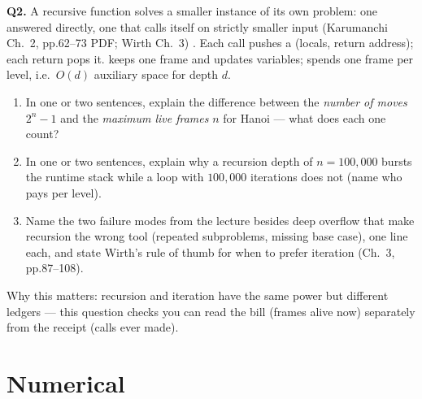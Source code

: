 \documentclass[11pt]{article}
\begin{document}
\textbf{Q2.} A recursive function solves a smaller instance of its own problem: one  answered directly, one  that calls itself on strictly smaller input (Karumanchi Ch.~2, pp.62--73 PDF; Wirth Ch.~3) \cite{Karumanchi2017_data_structures_algorithms_made_easy,Wirth2004_algorithms_data_structures}. Each call pushes a  (locals, return address); each return pops it.  keeps one frame and updates variables;  spends one frame per level, i.e.\ $O(d)$ auxiliary space for depth $d$.
\begin{enumerate}
  \item[(a)] In one or two sentences, explain the difference between the \emph{number of moves} $2^{n} - 1$ and the \emph{maximum live frames} $n$ for Hanoi --- what does each one count?
  \item[(b)] In one or two sentences, explain why a recursion depth of $n = 100{,}000$ bursts the runtime stack while a loop with $100{,}000$ iterations does not (name who pays per level).
  \item[(c)] Name the two failure modes from the lecture besides deep overflow that make recursion the wrong tool (repeated subproblems, missing base case), one line each, and state Wirth's rule of thumb for when to prefer iteration (Ch.~3, pp.87--108).
\end{enumerate}
Why this matters: recursion and iteration have the same power but different ledgers --- this question checks you can read the bill (frames alive now) separately from the receipt (calls ever made).

\section{Numerical}
\end{document}
